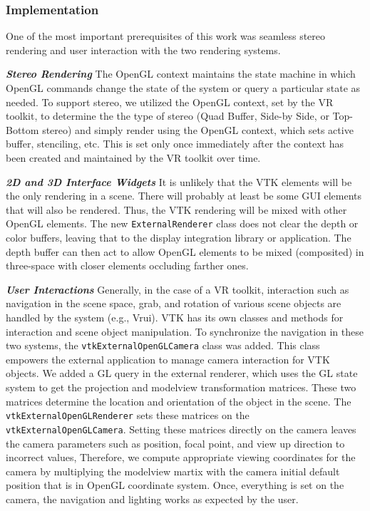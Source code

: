 \subsubsection{Implementation}

One of the most important prerequisites of this work was seamless stereo rendering and user interaction with the two rendering systems. 

\textbf{\textit{Stereo Rendering}} The OpenGL context maintains the state machine in which OpenGL commands change the state of the system or query a particular state as needed. To support stereo, we utilized the OpenGL context, set by the VR toolkit, to determine the the type of stereo (Quad Buffer, Side-by Side, or Top-Bottom stereo) and simply render using the OpenGL context, which sets active buffer, stenciling, etc. This is set only once immediately after the context has been created and maintained by the VR toolkit over time. 

\textbf{\textit{2D and 3D Interface Widgets}} It is unlikely that the VTK elements will be the only rendering in a scene. There will probably at least be some GUI elements that will also be rendered. Thus, the VTK rendering will be mixed with other OpenGL elements. The new \texttt{ExternalRenderer} class does not clear the depth or color buffers, leaving that to the display integration library or application. The depth buffer can then act to allow OpenGL elements to be mixed (composited) in three-space with closer elements occluding farther ones.

\textbf{\textit{User Interactions}} Generally, in the case of a VR toolkit, interaction such as navigation in the scene space, grab, and rotation of various scene objects are handled by the system (e.g., Vrui). VTK has its own classes and methods for interaction and scene object manipulation. To synchronize the navigation in these two systems, the \texttt{vtkExternalOpenGLCamera} class was added. This class empowers the external application to manage camera interaction for VTK objects. We added a GL query in the external renderer, which uses the GL state system to get the projection and modelview transformation matrices. These two matrices determine the location and orientation of the object in the scene. The \texttt{vtkExternalOpenGLRenderer} sets these matrices on the \texttt{vtkExternalOpenGLCamera}. Setting these matrices directly on the camera leaves the camera parameters such as position, focal point, and view up direction to incorrect values, Therefore, we compute appropriate viewing coordinates for the camera by multiplying the modelview martix with the camera initial default position that is in OpenGL coordinate system.  Once, everything is set on the camera, the navigation and lighting works as expected by the user.

